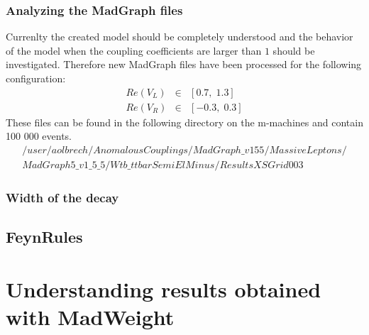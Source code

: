 \documentclass[a4paper,12pt]{report}
\begin{document}
\subsection{Analyzing the MadGraph files}\label{subsec:MadGraphFiles}
Currenlty the created model should be completely understood and the behavior of the model when the coupling coefficients are larger than $1$ should be investigated. Therefore new MadGraph files have been processed for the following configuration:
\begin{eqnarray*}
  Re(V_L) & \in & \left[  0.7, \; 1.3\right] \\
  Re(V_R) & \in & \left[ -0.3, \; 0.3\right]
\end{eqnarray*}
These files can be found in the following directory on the m-machines and contain 100 000 events.
\begin{eqnarray*}
  /user/aolbrech/AnomalousCouplings/MadGraph\_v155/MassiveLeptons/\\ MadGraph5\_v1\_5\_5/Wtb\_ttbarSemiElMinus/ResultsXSGrid003
\end{eqnarray*}

\subsection{Width of the decay}\label{subsec:DecayWidth}

\section{FeynRules}

\chapter{Understanding results obtained with MadWeight}
\end{document}
